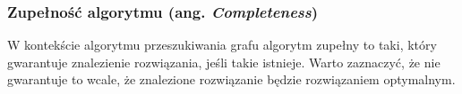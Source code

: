 \subsubsection{Zupełność algorytmu (ang. {\it Completeness})}
W kontekście algorytmu przeszukiwania grafu algorytm zupełny to taki, który gwarantuje znalezienie rozwiązania, jeśli takie istnieje.
Warto zaznaczyć, że nie gwarantuje to wcale, że znalezione rozwiązanie będzie rozwiązaniem optymalnym.

